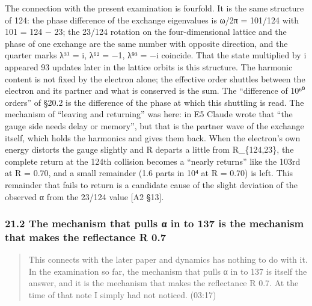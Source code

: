 \documentclass[
  a4paper,
]{article}
\begin{document}
The connection with the present examination is fourfold. It is the same
structure of 124: the phase difference of the exchange eigenvalues is
ω/2π = 101/124 with 101 = 124 − 23; the 23/124 rotation on the
four-dimensional lattice and the phase of one exchange are the same
number with opposite direction, and the quarter marks λ³¹ = i, λ⁶² = −1,
λ⁹³ = −i coincide. That the state multiplied by i appeared 93 updates
later in the lattice orbits is this structure. The harmonic content is
not fixed by the electron alone; the effective order shuttles between
the electron and its partner and what is conserved is the sum. The
``difference of 10⁶⁰ orders'' of §20.2 is the difference of the phase at
which this shuttling is read. The mechanism of ``leaving and returning''
was here: in E5 Claude wrote that ``the gauge side needs delay or
memory'', but that is the partner wave of the exchange itself, which
holds the harmonics and gives them back. When the electron's own energy
distorts the gauge slightly and R departs a little from R\_\{124,23\},
the complete return at the 124th collision becomes a ``nearly returns''
like the 103rd at R = 0.70, and a small remainder (1.6 parts in 10⁴ at R
= 0.70) is left. This remainder that fails to return is a candidate
cause of the slight deviation of the observed α from the 23/124 value
{[}A2 §13{]}.

\subsubsection{21.2 The mechanism that pulls α in to 137 is the
mechanism that makes the reflectance R
0.7}\label{the-mechanism-that-pulls-ux3b1-in-to-137-is-the-mechanism-that-makes-the-reflectance-r-0.7}

\begin{quote}
This connects with the later paper and dynamics has nothing to do with
it. In the examination so far, the mechanism that pulls α in to 137 is
itself the answer, and it is the mechanism that makes the reflectance R
0.7. At the time of that note I simply had not noticed. (03:17)
\end{quote}
\end{document}
